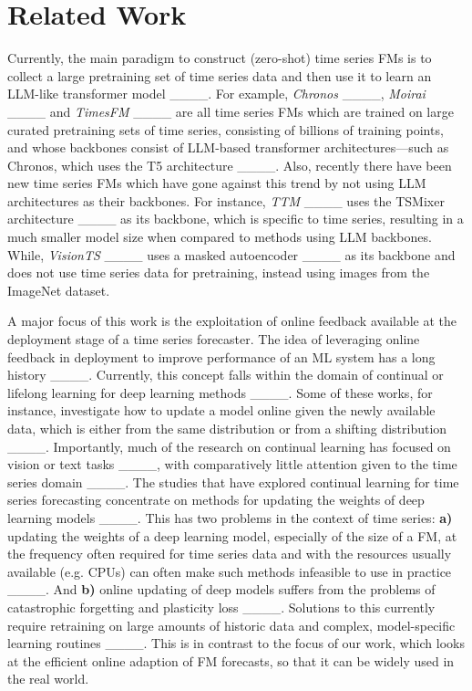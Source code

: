 \section{Related Work}
\label{sec:related_work}
Currently, the main paradigm to construct (zero-shot) time series FMs is to collect a large pretraining set of time series data and then use it to learn an LLM-like transformer model ____. For example, \textit{Chronos} ____, \textit{Moirai} ____ and \textit{TimesFM} ____ are all time series FMs which are trained on large curated pretraining sets of time series, consisting of billions of training points, and whose backbones consist of LLM-based transformer architectures---such as Chronos, which uses the T5 architecture ____. Also, recently there have been new time series FMs which have gone against this trend by not using LLM architectures as their backbones. For instance, \textit{TTM} ____ uses the TSMixer architecture ____ as its backbone, which is specific to time series, resulting in a much smaller model size when compared to methods using LLM backbones. While, \textit{VisionTS} ____ uses a masked autoencoder ____ as its backbone and does not use time series data for pretraining, instead using images from the ImageNet dataset.

A major focus of this work is the exploitation of online feedback available at the deployment stage of a time series forecaster. The idea of leveraging online feedback in deployment to improve performance of an ML system has a long history ____. Currently, this concept falls within the domain of continual or lifelong learning for deep learning methods ____. Some of these works, for instance, investigate how to update a model online given the newly available data, which is either from the same distribution or from a shifting distribution ____. Importantly, much of the research on continual learning has focused on vision or text tasks ____, with comparatively little attention given to the time series domain ____. The studies that have explored continual learning for time series forecasting concentrate on methods for updating the weights of deep learning models ____. This has two problems in the context of time series: \textbf{a)} updating the weights of a deep learning model, especially of the size of a FM, at the frequency often required for time series data and with the resources usually available (e.g. CPUs) can often make such methods infeasible to use in practice ____. And \textbf{b)} online updating of deep models suffers from the problems of catastrophic forgetting and plasticity loss ____. Solutions to this currently require retraining on large amounts of historic data and complex, model-specific learning routines ____. This is in contrast to the focus of our work, which looks at the efficient online adaption of FM forecasts, so that it can be widely used in the real world.